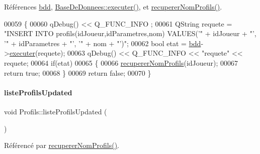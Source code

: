 Références \hyperlink{class_profils_a3703186987f1cd98ec9ca85d43f63fb7}{bdd}, \hyperlink{class_base_de_donnees_aa8de5f8f8bb17edc43f5c0ee33712081}{Base\+De\+Donnees\+::executer()}, et \hyperlink{class_profils_afe85f77aead9a7ea2f09f676d6e2c663}{recuperer\+Nom\+Profils()}.


\begin{DoxyCode}
00059 \{
00060     qDebug() << Q\_FUNC\_INFO ;
00061     QString requete = \textcolor{stringliteral}{"INSERT INTO profils(idJoueur,idParametres,nom) VALUES('"} + idJoueur + \textcolor{stringliteral}{"', '"} + 
      idParametres + \textcolor{stringliteral}{"', '"} + nom + \textcolor{stringliteral}{"')"};
00062     \textcolor{keywordtype}{bool} etat = \hyperlink{class_profils_a3703186987f1cd98ec9ca85d43f63fb7}{bdd}->\hyperlink{class_base_de_donnees_aa8de5f8f8bb17edc43f5c0ee33712081}{executer}(requete);
00063     qDebug() << Q\_FUNC\_INFO << \textcolor{stringliteral}{"requete"} << requete;
00064     \textcolor{keywordflow}{if}(etat)
00065     \{
00066         \hyperlink{class_profils_afe85f77aead9a7ea2f09f676d6e2c663}{recupererNomProfils}(idJoueur);
00067         \textcolor{keywordflow}{return} \textcolor{keyword}{true};
00068     \}
00069     \textcolor{keywordflow}{return} \textcolor{keyword}{false};
00070 \}
\end{DoxyCode}
\mbox{\label{class_profils_a8facf83b130f6583c9a29670faca948b}} 
\paragraph{\texorpdfstring{liste\+Profils\+Updated}{listeProfilsUpdated}}
{\footnotesize\ttfamily void Profils\+::liste\+Profils\+Updated (\begin{DoxyParamCaption}{ }\end{DoxyParamCaption})\hspace{0.3cm}{\ttfamily [signal]}}



Référencé par \hyperlink{class_profils_afe85f77aead9a7ea2f09f676d6e2c663}{recuperer\+Nom\+Profils()}.

\mbox{\label{class_profils_afe85f77aead9a7ea2f09f676d6e2c663}} 

